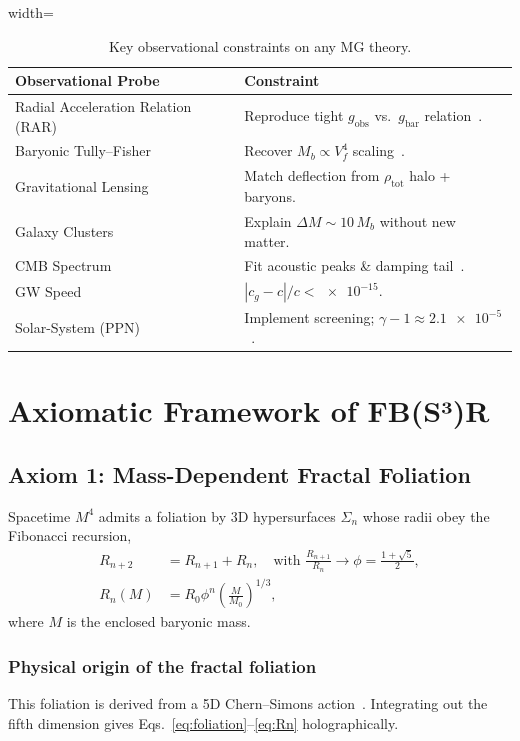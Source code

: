 \begin{table}[ht]
\caption{Key observational constraints on any MG theory.}
\label{tab:constraints}
\begin{adjustbox}{width=\columnwidth}
\begin{tabularx}{\columnwidth}{>{\raggedright\arraybackslash}p{2.5cm} X}
\toprule
Observational Probe & Constraint \\
\midrule
Radial Acceleration Relation (RAR) & Reproduce tight $g_{\mathrm{obs}}$ vs.\ $g_{\mathrm{bar}}$ relation~\cite{Lelli2017}. \\
Baryonic Tully--Fisher & Recover $M_b \propto V_f^4$ scaling~\cite{Lelli2017}. \\
Gravitational Lensing & Match deflection from $\rho_{\mathrm{tot}}$ halo + baryons. \\
Galaxy Clusters & Explain $\Delta M \sim 10 \, M_b$ without new matter. \\
CMB Spectrum & Fit acoustic peaks \& damping tail~\cite{Planck2020}. \\
GW Speed & $|c_g - c| / c < \num{e-15}$. \\
Solar-System (PPN) & Implement screening; $\gamma - 1 \approx \num{2.1e-5}$~\cite{Bertotti03}. \\
\bottomrule
\end{tabularx}
\end{adjustbox}
\end{table}

\section{Axiomatic Framework of FB(S³)R}
\subsection{Axiom 1: Mass-Dependent Fractal Foliation}
Spacetime $M^4$ admits a foliation by 3D hypersurfaces $\Sigma_n$ whose radii obey the Fibonacci recursion,
\begin{align}
    R_{n+2} &= R_{n+1} + R_n, \quad \text{with } \frac{R_{n+1}}{R_n} \to \phi = \frac{1 + \sqrt{5}}{2}, \label{eq:foliation} \\
    R_n(M) &= R_0 \phi^n \left( \frac{M}{M_0} \right)^{1/3}, \label{eq:Rn}
\end{align}
where $M$ is the enclosed baryonic mass.

\subsubsection*{Physical origin of the fractal foliation}
This foliation is derived from a 5D Chern--Simons action~\cite{Witten89,Elitzur89}. Integrating out the fifth dimension gives Eqs.~\eqref{eq:foliation}--\eqref{eq:Rn} holographically.

